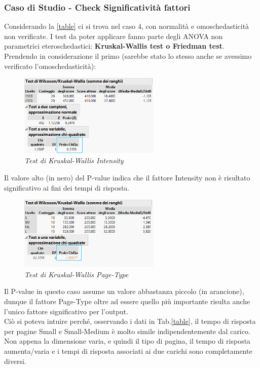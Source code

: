 \subsubsection{Caso di Studio - Check Significatività fattori}
Considerando la \ref{table} ci si trova nel caso 4, con normalità e omoschedasticità non verificate. I test da poter applicare fanno parte degli ANOVA non parametrici eteroschedastici: \textbf{Kruskal-Wallis test o Friedman test}.
Prendendo in considerazione il primo (sarebbe stato lo stesso anche se avessimo verificato l'omoschedasticità):
\begin{figure}[H]
	\centering
	\includegraphics[width=0.6\textwidth]{img/hw4/KW_i.png}
	\caption{\textit{Test di Kruskal-Wallis Intensity}}
\end{figure}
Il valore alto (in nero) del P-value indica che il fattore Intensity non è risultato significativo ai fini dei tempi di risposta.
\begin{figure}[H]
	\centering
	\includegraphics[width=0.6\textwidth]{img/hw4/KW_pt.png}
	\caption{\textit{Test di Kruskal-Wallis Page-Type}}
\end{figure}
Il P-value in questo caso assume un valore abbastanza piccolo (in arancione), dunque il fattore Page-Type oltre ad essere quello più importante risulta anche l'unico fattore significativo per l'output.
\\Ciò si poteva intuire perché, osservando i dati in Tab.\ref*{table}, il tempo di risposta per pagine Small e Small-Medium è molto simile indipendentemente dal carico. Non appena la dimensione varia, e quindi il tipo di pagina, il tempo di risposta aumenta/varia e i tempi di risposta associati ai due carichi sono completamente diversi. 